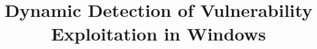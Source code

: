 
\usepackage{bookmark}
\usepackage[backend=bibtex]{biblatex}


\usepackage{longtable}
\usepackage[acronym,toc]{glossaries}
\makeglossaries

\newcommand*{\Listingautorefname}{Listing}
\newcommand*{\fullref}[1]{\hyperref[{#1}]{\autoref*{#1} (\nameref*{#1})}}

\usepackage[cache=false]{minted}
\usepackage{listings}
\usepackage{chngcntr}



\usepackage{fancyhdr}
\usepackage{lastpage}

\pagestyle{fancy}
\fancyhf{}
\fancyhead[L]{\rightmark}
\title{\LARGE Dynamic Detection of Vulnerability Exploitation in Windows}




\gdef\BackMatter{
  \cleardoublepage
  \printbibliography[heading=bibintoc]
}

